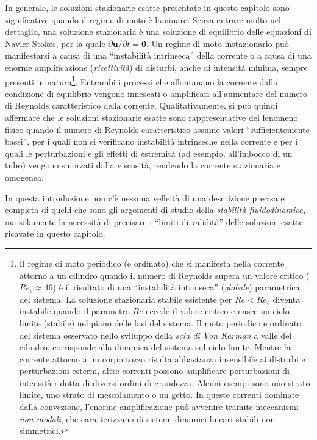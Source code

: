 In generale, le soluzioni stazionarie esatte presentate in questo capitolo sono significative quando il regime di moto è laminare. Senza entrare molto nel dettaglio, una soluzione stazionaria è una soluzione di equilibrio delle equazioni di Navier-Stokes, per la quale $\partial \bm{u}/\partial t = \bm{0}$. Un regime di moto instazionario può manifestarsi a causa di una ``instabilità intrinseca'' della corrente o a causa di una enorme amplificazione (\textit{ricettività}) di disturbi, anche di intensità minima, sempre presenti in natura\footnote{
Il regime di moto periodico (e ordinato) che si manifesta nella corrente attorno a un cilindro quando il numero di Reynolds supera un valore critico ($Re_c \approx 46$) è il risultato di una ``instabilità intrinseca'' (\textit{globale}) parametrica del sistema. La soluzione stazionaria stabile esistente per $Re < Re_c$ diventa instabile quando il parametro $Re$ eccede il valore critico e nasce un ciclo limite (stabile) nel piano delle fasi del sistema. Il moto periodico e ordinato del sistema osservato nello sviluppo della \textit{scia di Von Karman} a valle del cilindro, corrisponde alla dinamica del sistema sul ciclo limite.
\newline
Mentre la corrente attorno a un corpo tozzo risulta abbastanza insensibile ai disturbi e perturbazioni esterni, altre correnti possono amplificare perturbazioni di intensità ridotta di diversi ordini di grandezza. Alcuni esempi sono uno strato limite, uno strato di mescolamento o un getto. In queste correnti dominate dalla convezione, l'enorme amplificazione può avvenire tramite meccanismi \textit{non-modali}, che caratterizzano di sistemi dinamici lineari stabili non simmetrici.
}.
Entrambi i processi che allontanano la corrente dalla condizione di equilibrio vengono innescati o amplificati all'aumentare del numero di Reynolds caratteristico della corrente. Qualitativamente, si può quindi affermare che le soluzioni stazionarie esatte sono rappresentative del fenomeno fisico quando il numero di Reynolds caratteristico assume valori ``sufficientemente bassi'', per i quali non si verificano instabilità intrinseche nella corrente e per i quali le perturbazioni e gli effetti di estremità (ad esempio, all'imbocco di un tubo) vengono smorzati dalla viscosità, rendendo la corrente stazionaria e omogenea.

\begin{remark}
In questa introduzione non c'è nessuna velleità di una descrizione precisa e completa di quelli che sono gli argomenti di studio della \textit{stabilità fluidodinamica}, ma solamente la necessità di precisare i ``limiti di validità'' delle soluzioni esatte ricavate in questo capitolo.
\end{remark}


